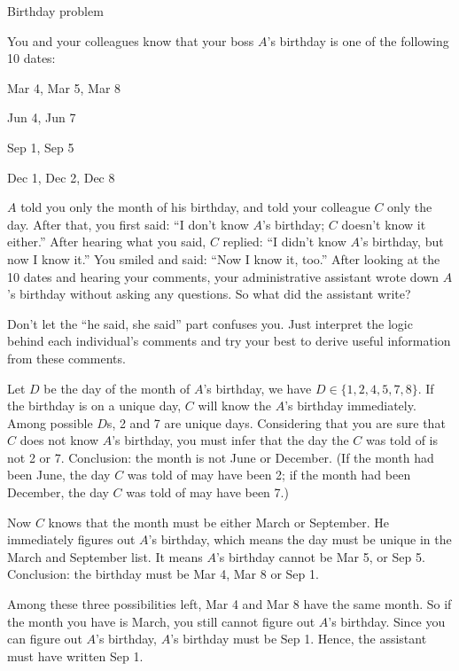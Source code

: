 \begin{problem}{Birthday problem}

You and your colleagues know that your boss $A$'s birthday is one of the following 10
dates:

Mar 4, Mar 5, Mar 8

Jun 4, Jun 7

Sep 1, Sep 5

Dec 1, Dec 2, Dec 8

$A$ told you only the month of his birthday, and told your colleague $C$ only the day. After
that, you first said: ``I don't know $A$'s birthday; $C$ doesn't know it either.'' After hearing
what you said, $C$ replied: ``I didn't know $A$'s birthday, but now I know it.'' You smiled
and said: ``Now I know it, too.'' After looking at the 10 dates and hearing your comments,
your administrative assistant wrote down $A$'s birthday without asking any questions. So
what did the assistant write?
\end{problem}

\begin{solution}
Don't let the ``he said, she said'' part confuses you. Just interpret the logic behind each
individual's comments and try your best to derive useful information from these comments.

Let $D$ be the day of the month of $A$'s birthday, we have $D\in\{1,2,4,5,7,8\}$. If the
birthday is on a unique day, $C$ will know the $A$'s birthday immediately. Among possible
$D$s, 2 and 7 are unique days. Considering that you are sure that $C$ does not know $A$'s
birthday, you must infer that the day the $C$ was told of is not 2 or 7. Conclusion: the
month is not June or December. (If the month had been June, the day $C$ was told of may
have been 2; if the month had been December, the day $C$ was told of may have been 7.)

Now $C$ knows that the month must be either March or September. He immediately figures
out $A$'s birthday, which means the day must be unique in the March and September list.
It means $A$'s birthday cannot be Mar 5, or Sep 5. Conclusion: the birthday must be Mar 4,
Mar 8 or Sep 1.

Among these three possibilities left, Mar 4 and Mar 8 have the same month. So if the month
you have is March, you still cannot figure out $A$'s birthday. Since you can figure out $A$'s
birthday, $A$'s birthday must be Sep 1. Hence, the assistant must have written Sep 1.\qedhere

\end{solution}

